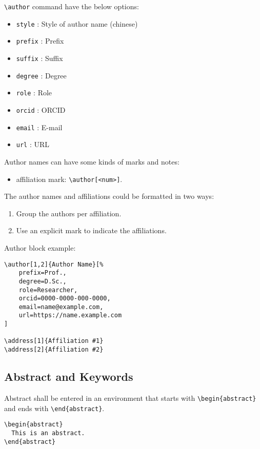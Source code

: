 \documentclass[
 twocolumn,
 hf,
]{ceurart}
\begin{document}
\verb|\author| command have the below options: 

\begin{itemize}
\item \verb|style| : Style of author name (chinese)
\item \verb|prefix| : Prefix
\item \verb|suffix| : Suffix
\item \verb|degree| : Degree
\item \verb|role| : Role
\item \verb|orcid| : ORCID
\item \verb|email| : E-mail
\item \verb|url| : URL
\end{itemize}

Author names can have some kinds of marks and notes:
\begin{itemize}
\item affiliation mark: \verb|\author[<num>]|.
\end{itemize}

The author names and affiliations could be formatted in two ways:
\begin{enumerate}
\item Group the authors per affiliation.
\item Use an explicit mark to indicate the affiliations.
\end{enumerate}

Author block example:
\begin{lstlisting}
\author[1,2]{Author Name}[%
    prefix=Prof.,
    degree=D.Sc.,
    role=Researcher,
    orcid=0000-0000-000-0000,
    email=name@example.com,
    url=https://name.example.com
]

\address[1]{Affiliation #1}
\address[2]{Affiliation #2}
\end{lstlisting}

\subsection{Abstract and Keywords}

Abstract shall be entered in an environment that starts
with \verb|\begin{abstract}| and ends with
\verb|\end{abstract}|. 

\begin{lstlisting}
\begin{abstract}
  This is an abstract.
\end{abstract}
\end{lstlisting}
\end{document}
